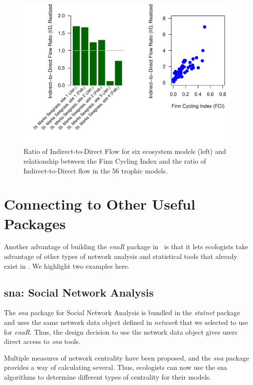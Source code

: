 \documentclass[article]{jss}
\begin{document}
\begin{figure}
  \center
\includegraphics[]{enaR-vignette-048}
\caption{Ratio of Indirect-to-Direct Flow for six ecosystem models
  (left) and relationship between the Finn Cycling Index and the ratio
  of Indirect-to-Direct flow in the 56 trophic models.} \label{fig:aec}
\end{figure}


\section{Connecting to Other Useful Packages}
Another advantage of building the \textit{enaR} package in \R\ is that
it lets ecologists take advantage of other types of network analysis
and statistical tools that already exist in \R.  We highlight two
examples here.

\subsection{sna: Social Network Analysis}
The \textit{sna} package for Social Network Analysis is bundled in the
\textit{statnet} package and uses the same network data object defined
in \textit{network} that we selected to use for \textit{enaR}.  Thus,
the design decision to use the network data object gives users direct
access to \textit{sna} tools.

Multiple measures of network centrality have been proposed, and the
\textit{sna} package provides a way of calculating several.  Thus,
ecologists can now use the sna algorithms to determine different types
of centrality for their models.
\end{document}
